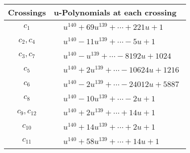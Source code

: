 \documentclass[1p]{elsarticle_modified}
\theoremstyle{definition}
\begin{document}
\begin{tabular}{m{50pt}|m{274pt}}
Crossings & \hspace{64pt}u-Polynomials at each crossing \\
\hline $$\begin{aligned}c_{1}\end{aligned}$$&$\begin{aligned}
&u^{140}+69 u^{139}+\cdots+221 u+1
\end{aligned}$\\
\hline $$\begin{aligned}c_{2},c_{4}\end{aligned}$$&$\begin{aligned}
&u^{140}-11 u^{139}+\cdots-5 u+1
\end{aligned}$\\
\hline $$\begin{aligned}c_{3},c_{7}\end{aligned}$$&$\begin{aligned}
&u^{140}- u^{139}+\cdots-8192 u+1024
\end{aligned}$\\
\hline $$\begin{aligned}c_{5}\end{aligned}$$&$\begin{aligned}
&u^{140}+2 u^{139}+\cdots-10624 u+1216
\end{aligned}$\\
\hline $$\begin{aligned}c_{6}\end{aligned}$$&$\begin{aligned}
&u^{140}-2 u^{139}+\cdots-24012 u+5887
\end{aligned}$\\
\hline $$\begin{aligned}c_{8}\end{aligned}$$&$\begin{aligned}
&u^{140}-10 u^{139}+\cdots-2 u+1
\end{aligned}$\\
\hline $$\begin{aligned}c_{9},c_{12}\end{aligned}$$&$\begin{aligned}
&u^{140}+2 u^{139}+\cdots+14 u+1
\end{aligned}$\\
\hline $$\begin{aligned}c_{10}\end{aligned}$$&$\begin{aligned}
&u^{140}+14 u^{139}+\cdots+2 u+1
\end{aligned}$\\
\hline $$\begin{aligned}c_{11}\end{aligned}$$&$\begin{aligned}
&u^{140}+58 u^{139}+\cdots+14 u+1
\end{aligned}$\\
\hline
\end{tabular}\\~\\
\end{document}

